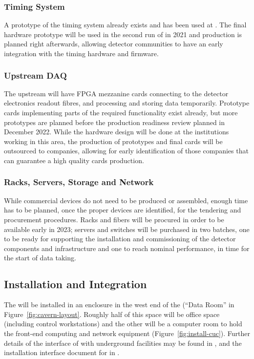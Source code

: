 \subsubsection{Timing System}
A prototype of the timing system already exists and has been used at . The final hardware prototype will be used in the second run of  in 2021 and production is planned right afterwards, allowing detector communities to have an early integration with the timing hardware and firmware.

\subsubsection{Upstream DAQ}
The upstream  will have FPGA mezzanine cards connecting to the detector electronics readout fibres, and processing and storing data temporarily. Prototype cards implementing parts of the required functionality exist already, but more prototypes are planned before the production readiness review planned in December 2022. While the hardware design will be done at the institutions working in this area, the production of prototypes and final cards will be outsourced to companies, allowing for early identification of those companies that can guarantee a high quality cards production.

\subsubsection{Racks, Servers, Storage and Network}
While commercial devices do not need to be produced or assembled, enough time has to be planned, once the proper devices are identified, for the tendering and procurement procedures. Racks and fibers will be procured in order to be available early in 2023; servers and switches will be purchased in two batches, one to be ready for supporting the installation and commissioning of the detector components and  infrastructure and one to reach nominal performance, in time for the start of data taking.

\subsection{Installation and Integration}

The  will be installed in an enclosure in the west end of the  (``Data Room'' in Figure~\ref{fig:cavern-layout}.  Roughly
half of this space will be office space (including control
workstations) and the other will be a computer room to hold the 
front-end computing and network equipment (Figure~\ref{fig:install-cuc}). Further details of the interface of  with underground facilities
may be found in , and the installation interface document for  in .


